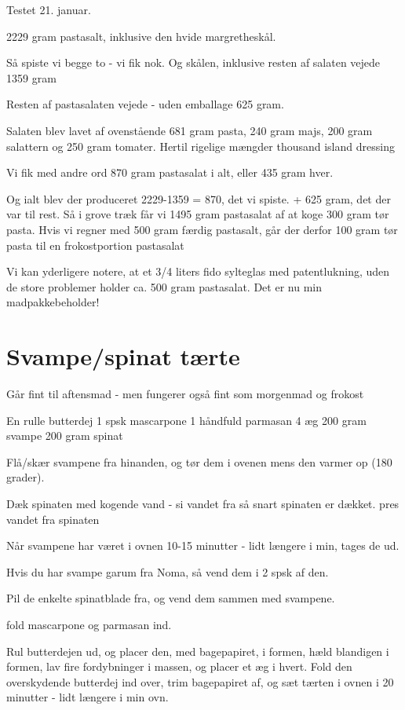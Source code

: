 \documentclass[
]{book}
\begin{document}
Testet 21. januar.

2229 gram pastasalt, inklusive den hvide margretheskål.

Så spiste vi begge to - vi fik nok. Og skålen, inklusive
resten af salaten vejede 1359 gram

Resten af pastasalaten vejede - uden emballage 625 gram.

Salaten blev lavet af ovenstående 681 gram pasta, 240 gram
majs, 200 gram salattern og 250 gram tomater. Hertil rigelige
mængder thousand island dressing

Vi fik med andre ord 870 gram pastasalat i alt, eller 435 gram hver.

Og ialt blev der produceret
2229-1359 = 870, det vi spiste.
+ 625 gram, det der var til rest.
Så i grove træk får vi 1495 gram pastasalat af at koge 300 gram
tør pasta. Hvis vi regner med 500 gram færdig pastasalt,
går der derfor 100 gram tør pasta til en frokostportion pastasalat

Vi kan yderligere notere, at et 3/4 liters fido sylteglas med
patentlukning, uden de store problemer holder ca. 500 gram
pastasalat. Det er nu min madpakkebeholder!

\section{Svampe/spinat tærte}\label{svampespinat-tuxe6rte}

Går fint til aftensmad - men fungerer også fint som morgenmad
og frokost

En rulle butterdej
1 spsk mascarpone
1 håndfuld parmasan
4 æg
200 gram svampe
200 gram spinat

Flå/skær svampene fra hinanden, og tør dem i ovenen mens den
varmer op (180 grader).

Dæk spinaten med kogende vand - si vandet fra så snart spinaten er
dækket.
pres vandet fra spinaten

Når svampene har været i ovnen 10-15 minutter - lidt længere i min,
tages de ud.

Hvis du har svampe garum fra Noma, så vend dem i 2 spsk af den.

Pil de enkelte spinatblade fra, og vend dem sammen med svampene.

fold mascarpone og parmasan ind.

Rul butterdejen ud, og placer den, med bagepapiret, i formen,
hæld blandigen i formen, lav fire fordybninger i massen, og placer
et æg i hvert. Fold den overskydende butterdej ind over, trim
bagepapiret af, og sæt tærten i ovnen i 20 minutter - lidt længere
i min ovn.
\end{document}
